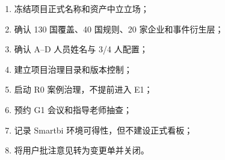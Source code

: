 \documentclass[UTF8,12pt,openany]{ctexbook}
\begin{document}
\begin{enumerate}[label=\ensuremath{\square}]
  \item 冻结项目正式名称和资产中立立场；
  \item 确认 130 国覆盖、40 国规则、20 家企业和事件衍生层；
  \item 确认 A--D 人员姓名与 3/4 人配置；
  \item 建立项目治理目录和版本控制；
  \item 启动 R0 案例治理，不提前进入 E1；
  \item 预约 G1 会议和指导老师抽查；
  \item 记录 Smartbi 环境可得性，但不建设正式看板；
  \item 将用户批注意见转为变更单并关闭。
\end{enumerate}

\backmatter
\printbibliography[title={参考文献与规则来源}]
\end{document}

